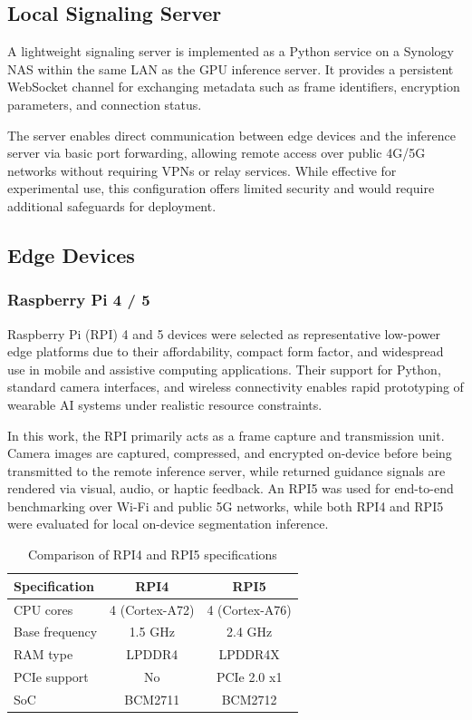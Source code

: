 \documentclass{ieeeaccess}
\begin{document}
\subsection{Local Signaling Server}

A lightweight signaling server is implemented as a Python service on a Synology NAS within the same LAN as the GPU inference server. It provides a persistent WebSocket channel for exchanging metadata such as frame identifiers, encryption parameters, and connection status.

The server enables direct communication between edge devices and the inference server via basic port forwarding, allowing remote access over public 4G/5G networks without requiring VPNs or relay services. While effective for experimental use, this configuration offers limited security and would require additional safeguards for deployment.

\subsection{Edge Devices}

\subsubsection{Raspberry Pi 4 / 5}
\label{ref:RPI}

Raspberry Pi (RPI) 4 and 5 devices were selected as representative low-power edge platforms due to their affordability, compact form factor, and widespread use in mobile and assistive computing applications. Their support for Python, standard camera interfaces, and wireless connectivity enables rapid prototyping of wearable AI systems under realistic resource constraints.

In this work, the RPI primarily acts as a frame capture and transmission unit. Camera images are captured, compressed, and encrypted on-device before being transmitted to the remote inference server, while returned guidance signals are rendered via visual, audio, or haptic feedback. An RPI5 was used for end-to-end benchmarking over Wi-Fi and public 5G networks, while both RPI4 and RPI5 were evaluated for local on-device segmentation inference.

\begin{table}[h]
\centering
\caption{Comparison of RPI4 and RPI5 specifications}
\label{tab:rpi_comparison}
\begin{tabular}{|l|c|c|}
\hline
\textbf{Specification} & \textbf{RPI4} & \textbf{RPI5} \\ \hline
CPU cores & 4 (Cortex-A72) & 4 (Cortex-A76) \\ \hline
Base frequency & 1.5 GHz & 2.4 GHz \\ \hline
RAM type & LPDDR4 & LPDDR4X \\ \hline
PCIe support & No & PCIe 2.0 x1 \\ \hline
SoC & BCM2711 & BCM2712 \\ \hline
\end{tabular}
\end{table}
\end{document}
